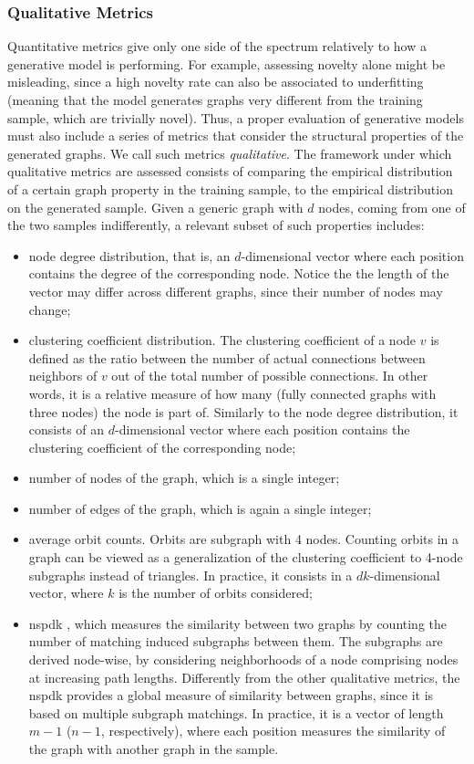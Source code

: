 \subsubsection*{Qualitative Metrics}
Quantitative metrics give only one side of the spectrum relatively to how a generative model is performing. For example, assessing novelty alone might be misleading, since a high novelty rate can also be associated to underfitting (meaning that the model generates graphs very different from the training sample, which are trivially novel). Thus, a proper evaluation of generative models must also include a series of metrics that consider the structural properties of the generated graphs. We call such metrics \emph{qualitative}. The framework under which qualitative metrics are assessed consists of comparing the empirical distribution of a certain graph property in the training sample, to the empirical distribution on the generated sample. Given a generic graph with $d$ nodes, coming from one of the two samples indifferently, a relevant subset of such properties includes:
\begin{itemize}
    \item node degree distribution, that is, an $d$-dimensional vector where each position contains the degree of the corresponding node. Notice the the length of the vector may differ across different graphs, since their number of nodes may change;
    \item clustering coefficient distribution. The clustering coefficient of a node $v$ is defined as the ratio between the number of actual connections between neighbors of $v$ out of the total number of possible connections. In other words, it is a relative measure of how many  (fully connected graphs with three nodes) the node is part of. Similarly to the node degree distribution, it consists of an $d$-dimensional vector where each position contains the clustering coefficient of the corresponding node;
    \item number of nodes of the graph, which is a single integer;
    \item number of edges of the graph, which is again a single integer;
    \item average orbit counts. Orbits are subgraph with 4 nodes. Counting orbits in a graph can be viewed as a generalization of the clustering coefficient to 4-node subgraphs instead of triangles. In practice, it consists in a $dk$-dimensional vector, where $k$ is the number of orbits considered;
    \item \gls{nspdk} \citep{costa2010nspdk}, which measures the similarity between two graphs by counting the number of matching induced subgraphs between them. The subgraphs are derived node-wise, by considering neighborhoods of a node comprising nodes at increasing path lengths. Differently from the other qualitative metrics, the \gls{nspdk} provides a global measure of similarity between graphs, since it is based on multiple subgraph matchings. In practice, it is a vector of length $m-1$ ($n-1$, respectively), where each position measures the similarity of the graph with another graph in the sample.
\end{itemize}
